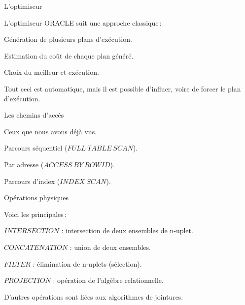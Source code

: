 
\begin{frame}{L'optimiseur}

L'optimiseur ORACLE suit une approche classique\,:
\begin{redbullet}
   \item Génération de plusieurs plans d'exécution.
   \item Estimation du coût de chaque plan généré.
   \item Choix du meilleur et exécution.
\end{redbullet}

Tout ceci est automatique, \alert{mais il est possible d'influer,
voire de forcer le plan d'exécution}.
\end{frame}

\begin{frame}{Les chemins d'accès}

Ceux que nous avons déjà vus.


\begin{redbullet}
  \item \alert{Parcours séquentiel} ($FULL\ TABLE\ SCAN$).
  \item \alert{Par adresse} ($ACCESS\ BY\ ROWID$).
 \item \alert{Parcours d'index} ($INDEX\ SCAN$).
\end{redbullet}

\end{frame}

\begin{frame}{Opérations physiques}


Voici les principales\,:
\begin{redbullet}
\item $INTERSECTION$ : intersection de deux ensembles de n-uplet.
\item $CONCATENATION$ : union de deux ensembles.
\item $FILTER$ : élimination de n-uplets (sélection).
\item $PROJECTION$ : opération de l'algèbre relationnelle.
\end{redbullet}

D'autres opérations sont liées aux algorithmes de jointures.

\end{frame}


